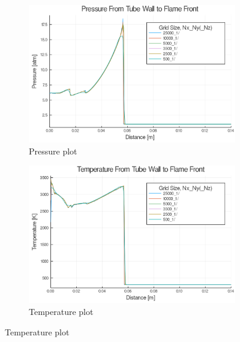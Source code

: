 \begin{figure}[]
    \centering
    \begin{subfigure}[]{\textwidth}
        \centering
        \includegraphics[width=\textwidth]{./figs/static1d/p.png}
        \caption{Pressure plot}
    \end{subfigure}

    \begin{subfigure}[]{\textwidth}
        \centering
        \includegraphics[width=\textwidth]{./figs/static1d/t.png}
        \caption{Temperature plot}
    \end{subfigure}

\end{figure}
